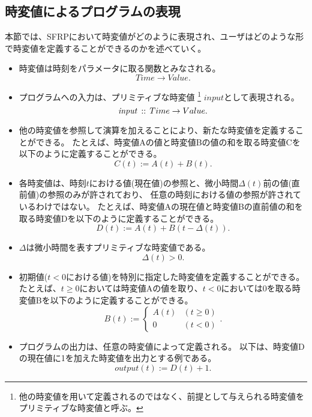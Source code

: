 \subsection{時変値によるプログラムの表現}\label{sec:language:model:program}
本節では、SFRPにおいて時変値がどのように表現され、ユーザはどのような形で時変値を定義することができるのかを述べていく。

\begin{itemize}
  \item
  時変値は時刻をパラメータに取る関数とみなされる。
  \begin{equation*}
    Time \rightarrow Value.
  \end{equation*}

  \item
  プログラムへの入力は、プリミティブな時変値
  \footnote{他の時変値を用いて定義されるのではなく、前提として与えられる時変値をプリミティブな時変値と呼ぶ。}
  $input$として表現される。
  \begin{equation*}
    {\it input} \, :: \, Time \rightarrow Value.
  \end{equation*}

  \item
  他の時変値を参照して演算を加えることにより、新たな時変値を定義することができる。
  たとえば、時変値Aの値と時変値Bの値の和を取る時変値Cを以下のように定義することができる。
  \begin{equation*}
    C(t) := A(t) + B(t).
  \end{equation*}

  \item
  各時変値は、時刻$t$における値(現在値)の参照と、微小時間$ \Delta(t) $前の値(直前値)の参照のみが許されており、
  任意の時刻における値の参照が許されているわけではない。
  たとえば、時変値Aの現在値と時変値Bの直前値の和を取る時変値Dを以下のように定義することができる。
  \begin{equation*}
    D(t) := A(t) + B(t - \Delta(t)).
  \end{equation*}

  \item
  $ \Delta $は微小時間を表すプリミティブな時変値である。
  \begin{equation*}
    \Delta(t) > 0.
  \end{equation*}

  \item
  初期値($ t < 0 $における値)を特別に指定した時変値を定義することができる。
  たとえば、$t \geq 0$においては時変値Aの値を取り、$t < 0$においては0を取る時変値Bを以下のように定義することができる。
  \begin{equation*}
    B(t) := \begin{cases}
      A(t) & (t \geq 0) \\
      0 & (t < 0)
    \end{cases}.
  \end{equation*}

  \item
  プログラムの出力は、任意の時変値によって定義される。
  以下は、時変値Dの現在値に1を加えた時変値を出力とする例である。
  \begin{equation*}
    output(t) := D(t) + 1.
  \end{equation*}
\end{itemize}

